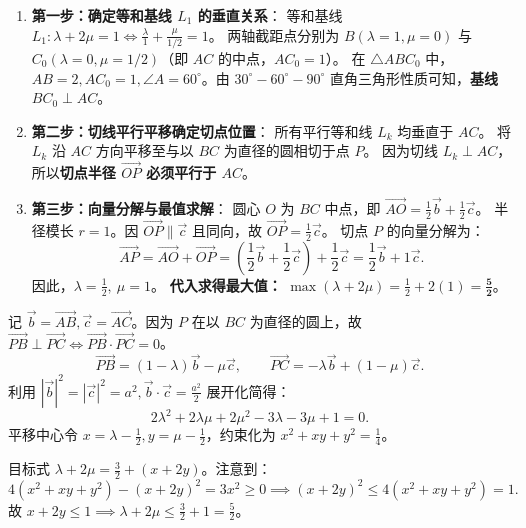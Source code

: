 \documentclass[11pt,a4paper,openany]{ctexbook}
\newcommand{\vect}[1]{\overrightarrow{#1}}
\begin{document}
\begin{solution}
\begin{methodbox}[title={方法二：等和线法（设边长 \(a=2\)——纯几何图解法）}]
\begin{enumerate}
  \item \textbf{第一步：确定等和基线 \(L_1\) 的垂直关系}：
        等和基线 \(L_1: \lambda+2\mu=1 \iff \frac{\lambda}{1} + \frac{\mu}{1/2} = 1\)。
        两轴截距点分别为 \(B(\lambda=1, \mu=0)\) 与 \(C_0(\lambda=0, \mu=1/2)\)（即 \(AC\) 的中点，\(AC_0=1\)）。
        在 \(\triangle AB C_0\) 中，\(AB=2, AC_0=1, \angle A=60^\circ\)。由 \(30^\circ-60^\circ-90^\circ\) 直角三角形性质可知，\textbf{基线 \(BC_0 \perp AC\)}。

  \item \textbf{第二步：切线平行平移确定切点位置}：
        所有平行等和线 \(L_k\) 均垂直于 \(AC\)。
        将 \(L_k\) 沿 \(AC\) 方向平移至与以 \(BC\) 为直径的圆相切于点 \(P\)。
        因为切线 \(L_k \perp AC\)，所以\textbf{切点半径 \(\vect{OP}\) 必须平行于 \(AC\)}。

  \item \textbf{第三步：向量分解与最值求解}：
        圆心 \(O\) 为 \(BC\) 中点，即 \(\vect{AO} = \frac{1}{2}\vec b + \frac{1}{2}\vec c\)。
        半径模长 \(r = 1\)。因 \(\vect{OP} \parallel \vec c\) 且同向，故 \(\vect{OP} = \frac{1}{2}\vec c\)。
        切点 \(P\) 的向量分解为：
        \[
        \vect{AP} = \vect{AO} + \vect{OP} = \left(\frac{1}{2}\vec b + \frac{1}{2}\vec c\right) + \frac{1}{2}\vec c = \frac{1}{2}\vec b + 1\vec c.
        \]
        因此，\(\lambda = \frac{1}{2},\ \mu = 1\)。
        \textbf{代入求得最大值：} \(\max(\lambda+2\mu) = \frac{1}{2} + 2(1) = \mathbf{\frac{5}{2}}\)。
\end{enumerate}
\end{methodbox}

\vspace{0.4em}
\begin{methodbox}[title={方法三：利用直径圆条件转化为二次型}]
记 \(\vec b = \vect{AB}, \vec c = \vect{AC}\)。因为 \(P\) 在以 \(BC\) 为直径的圆上，故 \(\vect{PB}\perp\vect{PC} \iff \vect{PB}\cdot\vect{PC} = 0\)。
\[
\vect{PB} = (1-\lambda)\vec b - \mu\vec c,\qquad \vect{PC} = -\lambda\vec b + (1-\mu)\vec c.
\]
利用 \(|\vec b|^2=|\vec c|^2=a^2, \vec b\cdot\vec c = \frac{a^2}{2}\) 展开化简得：
\[
2\lambda^2 + 2\lambda\mu + 2\mu^2 - 3\lambda - 3\mu + 1 = 0.
\]
平移中心令 \(x = \lambda-\frac{1}{2}, y = \mu-\frac{1}{2}\)，约束化为 \(x^2+xy+y^2 = \frac{1}{4}\)。

目标式 \(\lambda+2\mu = \frac{3}{2} + (x+2y)\)。注意到：
\[
4(x^2+xy+y^2) - (x+2y)^2 = 3x^2 \ge 0 \implies (x+2y)^2 \le 4(x^2+xy+y^2) = 1.
\]
故 \(x+2y \le 1 \implies \lambda+2\mu \le \frac{3}{2} + 1 = \frac{5}{2}\)。
\end{methodbox}


\end{solution}
\end{document}
